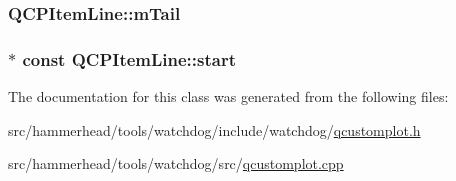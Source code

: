 \subsubsection[{\texorpdfstring{m\+Tail}{mTail}}]{ Q\+C\+P\+Item\+Line\+::m\+Tail\hspace{0.3cm}{\ttfamily [protected]}}\hypertarget{classQCPItemLine_ab8ed61dfe15bbb1cbf9b95eae95e242f}{}\label{classQCPItemLine_ab8ed61dfe15bbb1cbf9b95eae95e242f}
\subsubsection[{\texorpdfstring{start}{start}}]{$\ast$ const Q\+C\+P\+Item\+Line\+::start}\hypertarget{classQCPItemLine_a602da607a09498b0f152ada1d6851bc5}{}\label{classQCPItemLine_a602da607a09498b0f152ada1d6851bc5}


The documentation for this class was generated from the following files\+:\begin{DoxyCompactItemize}
\item 
src/hammerhead/tools/watchdog/include/watchdog/\hyperlink{qcustomplot_8h}{qcustomplot.\+h}\item 
src/hammerhead/tools/watchdog/src/\hyperlink{qcustomplot_8cpp}{qcustomplot.\+cpp}\end{DoxyCompactItemize}
